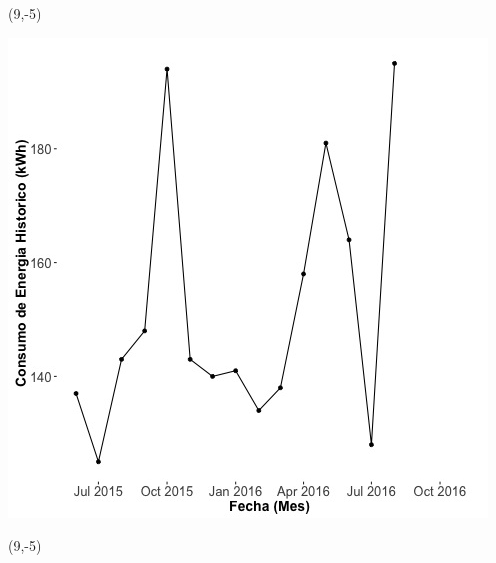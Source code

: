 \documentclass{article}\usepackage[]{graphicx}\usepackage[]{color}
\newenvironment{knitrout}{}{} %
\begin{document}
\begin{textblock}{1}(9,-5)
\begin{minipage}{20em}
\begingroup

\endgroup
\end{minipage}
\end{textblock}

\begin{knitrout}
\color{fgcolor}
\includegraphics[scale=0.65]{figure/A6_historico_energia} 
\end{knitrout}

\begin{textblock}{1}(9,-5)
\begin{minipage}{20em}
\begingroup

\endgroup
\end{minipage}
\end{textblock}
\end{document}
